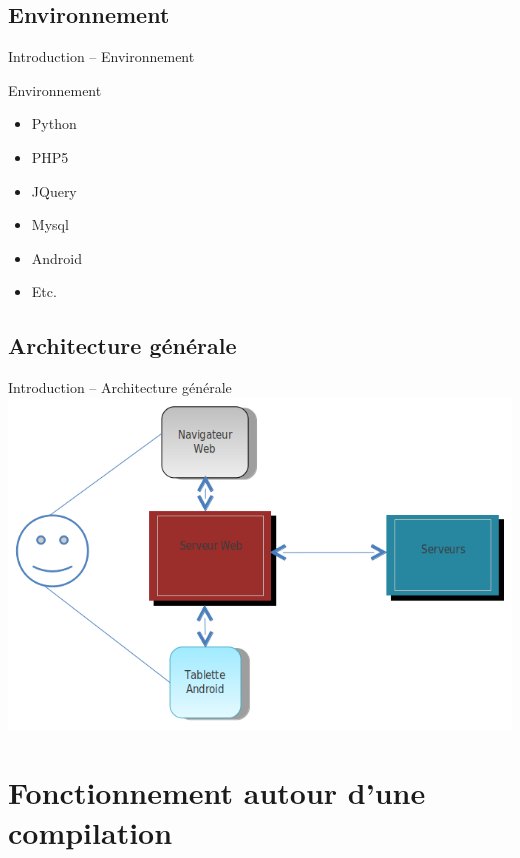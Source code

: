 \documentclass{beamer}
\begin{document}
\subsection{Environnement}
\begin{frame}{Introduction -- Environnement}
	\begin{block}{Environnement}
		\begin{itemize}
		\item Python
		\item PHP5
		\item JQuery
		\item Mysql
		\item Android
		\item Etc.
		\end{itemize}
	\end{block}
\end{frame}

\subsection{Architecture générale}
\begin{frame}{Introduction -- Architecture générale}
	\includegraphics[width=\textwidth]{./images/diaBiha.png}
\end{frame}

\section{Fonctionnement autour d'une compilation}
\end{document}

